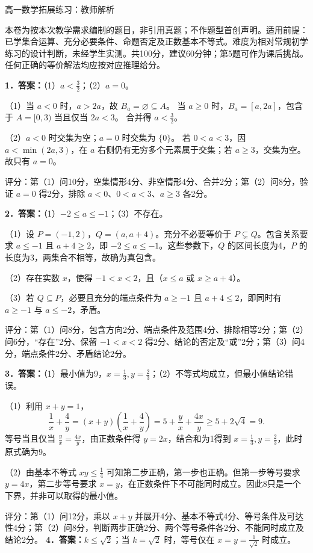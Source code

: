 \documentclass[UTF8,a4paper,11pt]{ctexart}
\begin{document}
\begin{center}{\LARGE 高一数学拓展练习：教师解析}\end{center}
本卷为按本次教学需求编制的题目，非引用真题；不作题型首创声明。适用前提：已学集合运算、充分必要条件、命题否定及正数基本不等式。难度为相对常规初学练习的设计判断，未经学生实测。共100分，建议60分钟；第5题可作为课后挑战。任何正确的等价解法均应按对应推理给分。

\textbf{1．答案：}\quad（1）$a<\frac32$；（2）$a=0$。

（1）当 $a<0$ 时，$a>2a$，故 $B_a=\varnothing\subseteq A$。
当 $a\ge0$ 时，$B_a=[a,2a]$，包含于 $A=[0,3)$ 当且仅当 $2a<3$。
合并得 $a<\frac32$。

（2）$a<0$ 时交集为空；$a=0$ 时交集为 $\{0\}$。
若 $0<a<3$，因 $a<\min(2a,3)$，在 $a$ 右侧仍有无穷多个元素属于交集；若 $a\ge3$，交集为空。故只有 $a=0$。

评分：第（1）问10分，空集情形4分、非空情形4分、合并2分；第（2）问8分，验证 $a=0$ 得2分，排除 $a<0$、$0<a<3$、$a\ge3$ 各2分。

\textbf{2．答案：}\quad（1）$-2\le a\le-1$；（3）不存在。

（1）设 $P=(-1,2)$，$Q=(a,a+4)$。充分不必要等价于 $P\subsetneq Q$。包含关系要求 $a\le-1$ 且 $a+4\ge2$，即 $-2\le a\le-1$。这些参数下，$Q$ 的区间长度为4，$P$ 的长度为3，两集合不相等，故确为真包含。

（2）存在实数 $x$，使得 $-1<x<2$，且（$x\le a$ 或 $x\ge a+4$）。

（3）若 $Q\subseteq P$，必要且充分的端点条件为 $a\ge-1$ 且 $a+4\le2$，即同时有 $a\ge-1$ 与 $a\le-2$，矛盾。

评分：第（1）问8分，包含方向2分、端点条件及范围4分、排除相等2分；第（2）问6分，“存在”2分、保留 $-1<x<2$ 得2分、结论的否定及“或”2分；第（3）问4分，端点条件2分、矛盾结论2分。

\textbf{3．答案：}\quad（1）最小值为9，$x=\frac13,y=\frac23$；（2）不等式均成立，但最小值结论错误。

（1）利用 $x+y=1$，
\[\frac1x+\frac4y=(x+y)\left(\frac1x+\frac4y\right)=5+\frac yx+\frac{4x}y\ge5+2\sqrt4=9.\]
等号当且仅当 $\frac yx=\frac{4x}y$，由正数条件得 $y=2x$，结合和为1得到 $x=\frac13,y=\frac23$，此时原式确为9。

（2）由基本不等式 $xy\le\frac14$ 可知第二步正确，第一步也正确。但第一步等号要求 $y=4x$，第二步等号要求 $x=y$，在正数条件下不可能同时成立。因此8只是一个下界，并非可以取得的最小值。

评分：第（1）问12分，乘以 $x+y$ 并展开4分、基本不等式4分、等号条件及可达性4分；第（2）问8分，判断两步正确2分、两个等号条件各2分、不能同时成立及结论2分。
\newpage
\textbf{4．答案：}\quad $k\le\sqrt2$；当 $k=\sqrt2$ 时，等号仅在 $x=y=\frac1{\sqrt2}$ 时成立。
\end{document}
